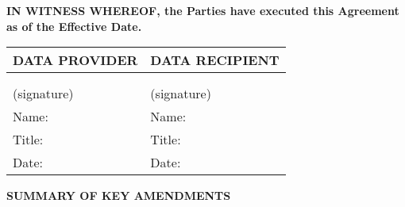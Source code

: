 \vspace{0.5cm}

\textbf{IN WITNESS WHEREOF, the Parties have executed this Agreement as of the  Effective Date.}

\vspace{1cm}

\begin{tabular}{|p{}|p{}|}
\hline
\textbf{DATA PROVIDER} & \textbf{DATA RECIPIENT} \\
\hline
 & \\
 & \\
\hline
(signature) & (signature) \\
\hline
Name: & Name: \\
\hline
Title: & Title: \\
\hline
Date: & Date: \\
\hline
\end{tabular}

\vspace{2cm}

\begin{center}
\textbf{\Large SUMMARY OF KEY AMENDMENTS}
\end{center}

